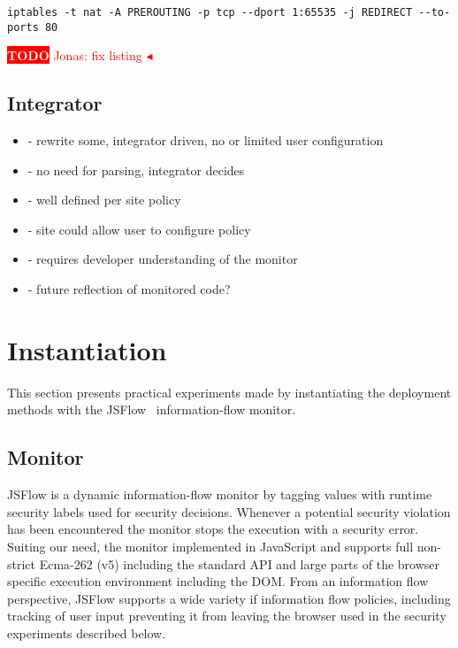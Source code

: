 \documentclass{llncs}
\newcommand{\todo}[1]{\colorbox{red}{\textcolor{white}{\sffamily\bfseries\scriptsize TODO}} \textcolor{red}{#1} \textcolor{red}{$\blacktriangleleft$}}
\begin{document}
\begin{lstlisting}[label=lst:iptables, caption=Example of redirecting ports using iptables]
iptables -t nat -A PREROUTING -p tcp --dport 1:65535 -j REDIRECT --to-ports 80
\end{lstlisting}
\todo{Jonas: fix listing}

\subsection{Integrator}

\begin{itemize}
\item- rewrite some, integrator driven, no or limited user configuration
\item- no need for parsing, integrator decides
\item- well defined per site policy
\item- site could allow user to configure policy
\item- requires developer understanding of the monitor
\item- future reflection of monitored code?
\end{itemize}


\section{Instantiation}
\label{sec:case}

This section presents practical experiments made by instantiating the deployment
methods with the JSFlow~\cite{Hedin:Sabelfeld:CSF12,JSFlow} information-flow monitor. 

\subsection{Monitor}

JSFlow is a dynamic information-flow monitor by tagging values with runtime
security labels used for security decisions. Whenever a potential security
violation has been encountered the monitor stops the execution with a security
error. Suiting our need, the monitor implemented in JavaScript and supports
full non-strict Ecma-262 (v5) including the standard API and large parts of the
browser specific execution environment including the DOM.  From an information
flow perspective, JSFlow supports a wide variety if information flow policies,
including tracking of user input preventing it from leaving the browser used in
the security experiments described below.
\end{document}
